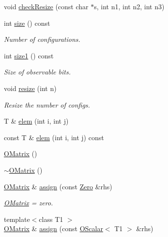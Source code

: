 \begin{DoxyCompactItemize}
\item 
void \mbox{\hyperlink{classENSEM_1_1OMatrix_a532d2138ecffc7a153b831401ca8b4df}{check\+Resize}} (const char $\ast$s, int n1, int n2, int n3)
\item 
int \mbox{\hyperlink{classENSEM_1_1OMatrix_a837821b951450cd49d3db25f566f5e47}{size}} () const
\begin{DoxyCompactList}\small\item\em Number of configurations. \end{DoxyCompactList}\item 
int \mbox{\hyperlink{classENSEM_1_1OMatrix_a850b4d2a93be69f82df4a2d0165bc397}{size1}} () const
\begin{DoxyCompactList}\small\item\em Size of observable bits. \end{DoxyCompactList}\item 
void \mbox{\hyperlink{classENSEM_1_1OMatrix_abb999e63b84b6d958e43443dc04e46be}{resize}} (int n)
\begin{DoxyCompactList}\small\item\em Resize the number of configs. \end{DoxyCompactList}\item 
T \& \mbox{\hyperlink{classENSEM_1_1OMatrix_a0a15388ff6dc8159664f6dc14a35b399}{elem}} (int i, int j)
\item 
const T \& \mbox{\hyperlink{classENSEM_1_1OMatrix_a27e0c9e142522126542006530bd7007b}{elem}} (int i, int j) const
\item 
\mbox{\hyperlink{classENSEM_1_1OMatrix_a65e880b856888dfd55e3f96b87afa0e7}{O\+Matrix}} ()
\item 
\mbox{\hyperlink{classENSEM_1_1OMatrix_a776f568bf59002385426232cba0c0d57}{$\sim$\+O\+Matrix}} ()
\item 
\mbox{\hyperlink{classENSEM_1_1OMatrix}{O\+Matrix}} \& \mbox{\hyperlink{classENSEM_1_1OMatrix_a9b8826edfb36e1bc701a7778424cfe31}{assign}} (const \mbox{\hyperlink{structENSEM_1_1Zero}{Zero}} \&rhs)
\begin{DoxyCompactList}\small\item\em \mbox{\hyperlink{classENSEM_1_1OMatrix}{O\+Matrix}} = zero. \end{DoxyCompactList}\item 
{\footnotesize template$<$class T1 $>$ }\\\mbox{\hyperlink{classENSEM_1_1OMatrix}{O\+Matrix}} \& \mbox{\hyperlink{classENSEM_1_1OMatrix_af0aaac940f907eb3db104e9f57b90a4f}{assign}} (const \mbox{\hyperlink{classENSEM_1_1OScalar}{O\+Scalar}}$<$ T1 $>$ \&rhs)

\end{DoxyCompactItemize}
